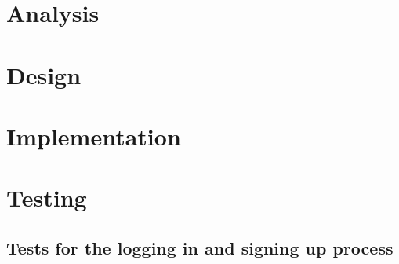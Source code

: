 \documentclass{article}
\begin{document}
\section{Analysis}






\section{Design}







\section{Implementation}






\section{Testing}
\subsection{Tests for the logging in and signing up process}
\end{document}
